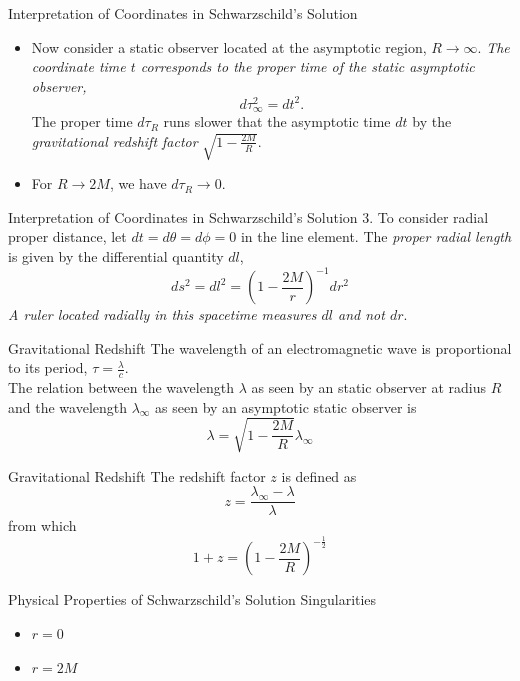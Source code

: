 \documentclass{beamer}
\begin{document}
\begin{darkframes}
        \begin{frame}{Interpretation of Coordinates in Schwarzschild's Solution}
        	\begin{itemize}
        	\item Now consider a static observer located at the asymptotic region, $R \longrightarrow \infty$. \textit{The coordinate time $t$ corresponds to the proper time of the static asymptotic observer,}
$$ d\tau_\infty ^2 = dt^2 .$$
			\pause
			The proper time $d\tau_R$ runs slower that the asymptotic time $dt$ by the \textit{gravitational redshift factor} $\sqrt{1-\frac{2M}{R}}$.\\
            \pause
            \bigskip
			\item For $R \longrightarrow 2M$, we have $d\tau_R \longrightarrow 0$.
          	\end{itemize}
    	\end{frame}
        
        \begin{frame}{Interpretation of Coordinates in Schwarzschild's Solution}
        	3. To consider radial proper distance, let $ dt = d\theta = d\phi = 0 $ in the line element. The
\textit{proper radial length} is given by the differential quantity $dl$,
$$ ds^2 = dl^2 = \left( 1 - \frac{2M}{r} \right)^{-1} dr^2 $$
			\pause
            \textit{A ruler located radially in this spacetime measures $dl$ and not $dr$}.
    	\end{frame}
        
        \begin{frame}{Gravitational Redshift}
        	The wavelength of an electromagnetic wave is proportional to its period, $\tau=\frac{\lambda}{c}$.\\
            \bigskip
            The relation between the wavelength $\lambda$ as seen by an static observer at radius $R$ and the wavelength $\lambda_{\infty}$ as seen by an asymptotic static observer is
$$ \lambda = \sqrt{ 1 - \frac{2M}{R}} \lambda_\infty $$
        \end{frame}
        
        \begin{frame}{Gravitational Redshift}
        	The redshift factor $z$ is defined as
			$$ z = \frac{ \lambda_\infty - \lambda}{\lambda} $$
			from which 
			$$ 1 + z = 
            \left( 1 - \frac{2M}{R} \right)^{-\frac{1}{2}} $$
        \end{frame}
        
        \begin{frame}{Physical Properties of Schwarzschild's Solution}
    		Singularities
            \begin{itemize}
				\item $r = 0$ 
				\item $r = 2M$ 
            \end{itemize}
    	\end{frame}
        

\end{darkframes}
\end{document}
